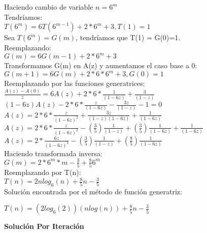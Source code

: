 \documentclass{article}
\begin{document}
\begin{enumerate}[label=\textbf{\alph*.}]
  Haciendo cambio de variable $n=6^m$\\
  Tendríamos:\\
  $T(6^m)=6T(6^{m-1})+2*6^m+3, T(1)=1$\\
  Sea $T(6^m) = G(m)$, tendríamos que T(1) = G(0)=1.\\
  Reemplazando:\\
  $G(m)=6G(m-1)+2*6^m+3$\\
  Transformamos G(m) en A(z) y aumentamos el caso base a 0:\\
  $G(m+1)=6G(m)+2*6*6^{m}+3, G(0)=1$\\
  Reemplazando por las funciones generatrices:\\
  $\frac{A(z) - A(0)}{z} = 6A(z) + 2*6*\frac{1}{(1-6z)} +\frac{3}{(1-z)}$\\
  $(1-6z)A(z) - 2*6*\frac{z}{(1-6z)} - \frac{3z}{(1-z)} - 1=0$\\
  $A(z) = 2*6*\frac{z}{(1-6z)^2} + \frac{3z}{(1-z)(1-6z)} + \frac{1}{(1-6z)}$\\
  $A(z) = 2*6*\frac{z}{(1-6z)^2} - (\frac{3}{5})\frac{1}{(1-z)} + (\frac{3}{5})\frac{1}{(1-6z)} + \frac{1}{(1-6z)}$\\
  $A(z) = 2*\frac{6z}{(1-6z)^2} - (\frac{3}{5})\frac{1}{(1-z)} + (\frac{8}{5})\frac{1}{(1-6z)}$\\
  Haciendo transformada inversa:\\
  $G(m) = 2*6^m *m - \frac{3}{5} + \frac{8}{5}6^m$\\
  Reemplazando por T(n):\\
  $T(n) = 2nlog_6(n) + \frac{8}{5}n - \frac{3}{5}$\\
  
  Soluci\'on encontrada por el m\'etodo de función generatriz:
  \begin{center}
  	$T(n) = (2log_6(2))(nlog(n)) + \frac{8}{5}n - \frac{3}{5}$\\
  \end{center}
  
  \textbf{Soluci\'on Por Iteraci\'on}
  

\end{enumerate}
\end{document}
